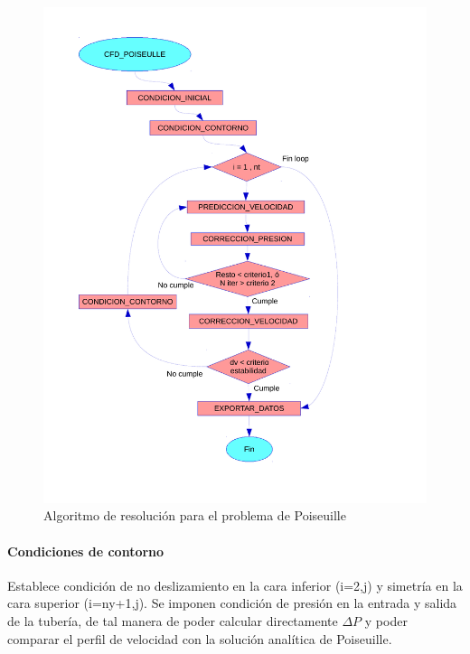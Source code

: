 \begin{center}
\begin{figure}
\includegraphics[width=1\textwidth]{diagrama_flujo_1.pdf}
\caption{Algoritmo de resolución para el problema de Poiseuille} \label{algoritmo}
\end{figure}
\end{center}

\paragraph{Condiciones de contorno} Establece condición de no deslizamiento en la cara inferior (i=2,j) y simetría en la cara superior (i=ny+1,j). Se imponen condición de presión en la entrada y salida de la tubería, de tal manera de poder calcular directamente $\Delta P$ y poder comparar el perfil de velocidad con la solución analítica de Poiseuille.
